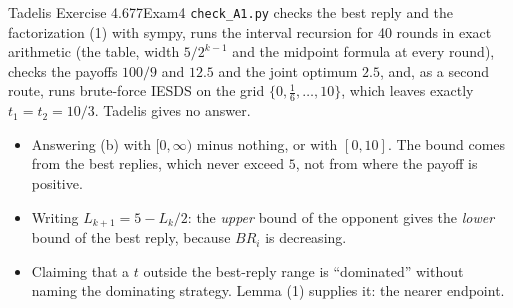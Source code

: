 \begin{exsol}{Tadelis Exercise 4.6}{77}{Exam}{4}
\verify \texttt{check\_A1.py} checks the best reply and the factorization (1) with sympy, runs the
interval recursion for 40 rounds in exact arithmetic (the table, width $5/2^{k-1}$ and the
midpoint formula at every round), checks the payoffs $100/9$ and $12.5$ and the joint optimum
$2.5$, and, as a second route, runs brute-force IESDS on the grid $\{0, \tfrac16, \dots, 10\}$,
which leaves exactly $t_1 = t_2 = 10/3$. Tadelis gives no answer.

\mistakes
\begin{itemize}
  \item Answering (b) with $[0, \infty)$ minus nothing, or with $[0, 10]$. The bound comes from
  the best replies, which never exceed $5$, not from where the payoff is positive.
  \item Writing $L_{k+1} = 5 - L_k/2$: the \emph{upper} bound of the opponent gives the
  \emph{lower} bound of the best reply, because $BR_i$ is decreasing.
  \item Claiming that a $t$ outside the best-reply range is ``dominated'' without naming the
  dominating strategy. Lemma (1) supplies it: the nearer endpoint.
\end{itemize}

\end{exsol}
